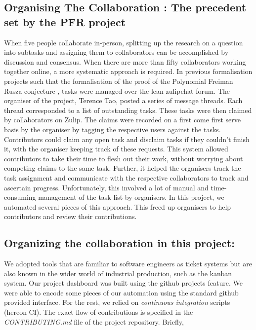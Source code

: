 \subsection{Organising The Collaboration : The precedent set by the PFR project}
When five people collaborate in-person, splitting up the research on a question into subtasks and assigning them to collaborators can be accomplished by discussion and consensus. When there are more than fifty collaborators working together online, a more systematic approach is required. In previous formalisation projects such that the formalisation of the proof of the Polynomial Freiman Rusza conjecture \cite{PFR_Tao_Dilles_2023}, tasks were managed over the lean zulipchat forum. The organiser of the project, Terence Tao, posted a series of message threads. Each thread corresponded to a list of outstanding tasks. These tasks were then claimed by collaborators on Zulip. The claims were recorded on a first come first serve basis by the organiser by tagging the respective users against the tasks. Contributors could claim any open task and disclaim tasks if they couldn't finish it, with the organiser keeping track of these requests. This system allowed contributors to take their time to flesh out their work, without worrying about competing claims to the same task. Further, it helped the organisers track the task assignment and communicate with the respective collaborators to track and ascertain progress. Unfortunately, this involved a lot of manual and time-consuming management of the task list by organisers. In this project, we automated several pieces of this approach. This freed up organisers to help contributors and review their contributions.

\subsection{Organizing the collaboration in this project:}
We adopted tools that are familiar to software engineers as ticket systems but are also known in the wider world of industrial production, such as the kanban system. Our project dashboard was built using the github projects feature. We were able to encode some pieces of our automation using the standard github provided interface. For the rest, we relied on \emph{continuous integration} scripts (hereon CI). The exact flow of contributions is specified in the \emph{CONTRIBUTING.md} file of the project repository\cite{The_Equational_Theories_repository}. Briefly,

